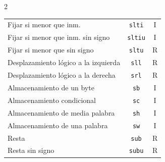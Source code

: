 \documentclass[11pt, a4paper]{article}
\begin{document}
\begin{multicols*}{2}
\begin{tcolorbox}[
        colback=white, 
        colframe=blue!40!black, 
        title= {\centering \textbf{Repertorio de Instrucciones MIPS32} },
        fonttitle=\bfseries,
        size=small
        ]
\begin{tabularx}{\linewidth}{Xcc}
                Fijar si menor que inm. & \texttt{slti} & I \\
                Fijar si menor que inm. sin signo & \texttt{sltiu} & I \\
                Fijar si menor que sin signo & \texttt{sltu} & R \\
                Desplazamiento lógico a la izquierda & \texttt{sll} & R \\
                Desplazamiento lógico a la derecha & \texttt{srl} & R \\
                Almacenamiento de un byte & \texttt{sb} & I \\
                Almacenamiento condicional & \texttt{sc} & I \\
                Almacenamiento de media palabra & \texttt{sh} & I \\
                Almacenamiento de una palabra & \texttt{sw} & I \\
                Resta & \texttt{sub} & R \\
                Resta sin signo & \texttt{subu} & R \\
            \end{tabularx}
        \end{tcolorbox}


\end{multicols*}
\end{document}
